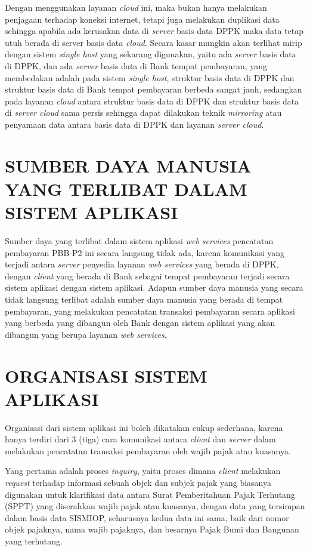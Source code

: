 \documentclass[pdftex,12pt, oneside]{article}
\begin{document}
\begin{enumerate}
Dengan menggunakan layanan \textit{cloud} ini, maka bukan hanya melakukan penjagaan terhadap koneksi internet, tetapi juga melakukan duplikasi data sehingga apabila ada kerusakan data di \textit{server} basis data DPPK maka data tetap utuh berada di server basis data \textit{cloud}. Secara kasar mungkin akan terlihat mirip dengan sistem \textit{single host} yang sekarang digunakan, yaitu ada \textit{server} basis data di DPPK, dan ada \textit{server} basis data di Bank tempat pembayaran, yang membedakan adalah pada sistem \textit{single host}, struktur basis data di DPPK dan struktur basis data di Bank tempat pembayaran berbeda sangat jauh, sedangkan pada layanan \textit{cloud} antara struktur basis data di DPPK dan struktur basis data di \textit{server cloud} sama persis sehingga dapat dilakukan teknik \textit{mirroring} atau penyamaan data antara basis data di DPPK dan layanan \textit{server cloud}.

\end{enumerate}


\section{SUMBER DAYA MANUSIA YANG TERLIBAT DALAM SISTEM APLIKASI}

Sumber daya yang terlibat dalam sistem aplikasi \textit{web services} pencatatan pembayaran PBB-P2 ini secara langsung tidak ada, karena komunikasi yang terjadi antara \textit{server} penyedia layanan \textit{web services} yang berada di DPPK, dengan \textit{client} yang berada di Bank sebagai tempat pembayaran terjadi secara sistem aplikasi dengan sistem aplikasi. Adapun sumber daya manusia yang secara tidak langsung terlibat adalah sumber daya manusia yang berada di tempat pembayaran, yang melakukan pencatatan transaksi pembayaran secara aplikasi yang berbeda yang dibangun oleh Bank dengan sistem aplikasi yang akan dibangun yang berupa layanan \textit{web services}.


\section{ORGANISASI SISTEM APLIKASI}

Organisasi dari sistem aplikasi ini boleh dikatakan cukup sederhana, karena hanya terdiri dari 3 (tiga) cara komunikasi antara \textit{client} dan \textit{server} dalam melakukan pencatatan transaksi pembayaran oleh wajib pajak atau kuasanya.

Yang pertama adalah proses \textit{inquiry}, yaitu proses dimana \textit{client} melakukan \textit{request} terhadap informasi sebuah objek dan subjek pajak yang biasanya digunakan untuk klarifikasi data antara Surat Pemberitahuan Pajak Terhutang (SPPT) yang diserahkan wajib pajak atau kuasanya, dengan data yang tersimpan dalam basis data SISMIOP, seharusnya kedua data ini sama, baik dari nomor objek pajaknya, nama wajib pajaknya, dan besarnya Pajak Bumi dan Bangunan yang terhutang. 
\end{document}
